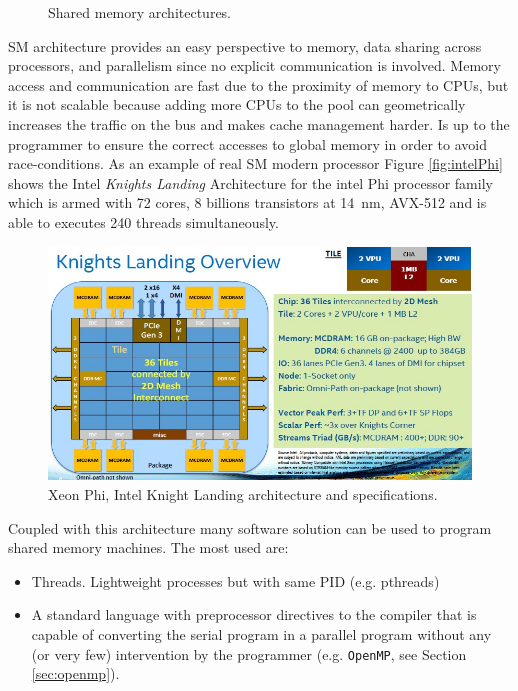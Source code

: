 \begin{description}
\begin{description}
\begin{itemize}
\begin{figure}
			\hfill
			\hfill
			\caption{Shared memory architectures.}
			\label{fig:UMA_NUMA}
		\end{figure}
	\end{itemize}
	SM architecture provides an easy perspective to memory,	data sharing across processors, and parallelism since no explicit communication is involved. Memory access and communication are fast due to the proximity of memory to CPUs, but it is not scalable because adding more CPUs to the pool can geometrically increases the traffic on the bus and makes cache management harder. Is up to the programmer to ensure the correct accesses to global memory in order to avoid race-conditions.
	As an example of real SM modern processor Figure \ref{fig:intelPhi} shows the Intel \textit{Knights Landing} Architecture for the intel Phi processor family which is armed with 72 cores, $8$ billions transistors at \SI{14}{\nano\metre}, AVX-512 and is able to executes 240 threads simultaneously.
		\begin{figure}
		\centering
		\label{fig:distribuiteMemory}
		\includegraphics[scale=0.45]{./images/parallel_programming/xeonphi}
		\caption{Xeon Phi, Intel Knight Landing architecture and specifications.}
	\end{figure}
	Coupled with this architecture many software solution can be used to program
	shared memory machines. The most used are:
	\begin{itemize}
		\item Threads. Lightweight processes but with same PID (e.g. pthreads)
		\item A standard language with preprocessor directives to the compiler that is capable of converting the serial program in a parallel program without any (or very few) intervention by the programmer (e.g. \texttt{OpenMP}, see Section \ref{sec:openmp}).
		

\end{itemize}
\end{description}
\end{description}
